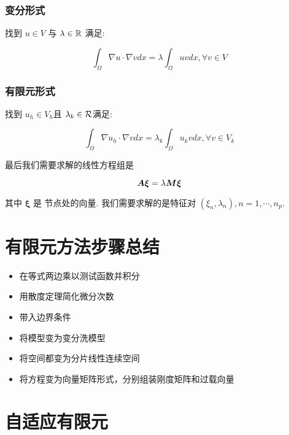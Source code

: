\documentclass{article}
\begin{document}
\subsubsection{变分形式}
找到 $u\in V$ 与 $\lambda\in{\mathbb R}$ 满足:

\begin{equation}
    \int_{\Omega}\nabla u\cdot\nabla vdx=\lambda\int_{\Omega}uvdx,\forall v\in V
\end{equation}

\subsubsection{有限元形式}
找到 $u_h\in V_h$且 $\lambda_k\in{\mathcal R}$满足:

\begin{equation}
\int_{\Omega}\nabla u_h\cdot\nabla vdx=\lambda_k\int_{\Omega}u_kvdx,\forall
v\in V_k
\end{equation}

最后我们需要求解的线性方程组是 

\begin{equation}
    {\boldsymbol A} \boldsymbol {\xi} = \lambda {\boldsymbol M} \boldsymbol{\xi}
\end{equation}

其中 $\boldsymbol \xi$ 是 节点处的向量. 我们需要求解的是特征对 $(\xi_n,
\lambda_n), n = 1, \cdots, n_p$. 

\section{有限元方法步骤总结}
\begin{itemize}
\item 在等式两边乘以测试函数并积分
\item 用散度定理简化微分次数
\item 带入边界条件
\item 将模型变为变分洗模型
\item 将空间都变为分片线性连续空间
\item 将方程变为向量矩阵形式，分别组装刚度矩阵和过载向量
\end{itemize}

\section{自适应有限元}
\end{document}
